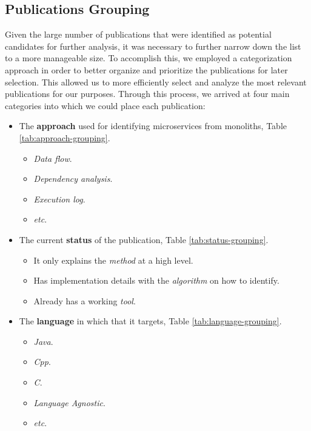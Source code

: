 \documentclass[conference]{IEEEtran}
\begin{document}
\subsection{Publications Grouping}

Given the large number of publications that were identified as potential
candidates for further analysis, it was necessary to further narrow down the
list to a more manageable size. To accomplish this, we employed a
categorization approach in order to better organize and prioritize the
publications for later selection. This allowed us to more efficiently select
and analyze the most relevant publications for our purposes. Through this
process, we arrived at four main categories into which we could place each
publication:

\begin{itemize}
  \item The \textbf{approach} used for identifying microservices from
    monoliths, Table \ref{tab:approach-grouping}.
  \begin{itemize}
    \item \textit{Data flow}.
    \item \textit{Dependency analysis}.
    \item \textit{Execution log}.
    \item \textit{etc}.
  \end{itemize}
  \item The current \textbf{status} of the publication, Table
    \ref{tab:status-grouping}.
  \begin{itemize}
    \item It only explains the \textit{method} at a high level.
    \item Has implementation details with the \textit{algorithm} on how to
      identify.
    \item Already has a working \textit{tool}.
  \end{itemize}
  \item The \textbf{language} in which that it targets, Table
    \ref{tab:language-grouping}.
  \begin{itemize}
    \item \textit{Java}.
    \item \textit{Cpp}.
    \item \textit{C}.
    \item \textit{Language Agnostic}.
    \item \textit{etc}.
  \end{itemize}
\end{itemize}
\end{document}
